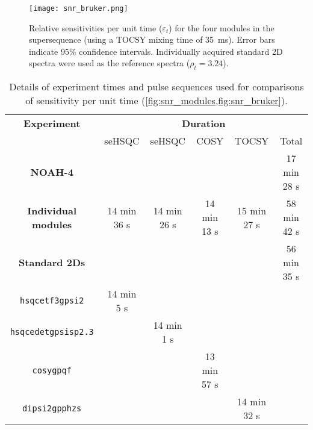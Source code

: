 \begin{figure}
    \centering
    \texttt{[image: snr\_bruker.png]}
    \caption{
        Relative sensitivities per unit time ($\varepsilon_t$) for the four modules in the  supersequence (using a TOCSY mixing time of \SI{35}{\ms}).
        Error bars indicate 95\% confidence intervals.
        Individually acquired standard 2D spectra were used as the reference spectra ($\rho_t = 3.24$).
        \zolmi{}
    }
    \label{fig:snr_bruker}
\end{figure}

{ %
\renewcommand{\arraystretch}{1.1}
\begin{table}
    \centering
    \begin{tabular}{cccccc}
        \toprule
        \textbf{Experiment} & \multicolumn{5}{c}{\textbf{Duration}} \\
                            & \nitrogen{} seHSQC & \carbon{} seHSQC & COSY & TOCSY & Total \\
        \midrule
        \textbf{NOAH-4}             & & & & & 17 min 28 s \\
        \midrule
        \textbf{Individual modules} & 14 min 36 s & 14 min 26 s & 14 min 13 s & 15 min 27 s & 58 min 42 s \\
        \midrule
        \textbf{Standard 2Ds}       & & & & & 56 min 35 s \\
        \texttt{hsqcetf3gpsi2}      & 14 min 5 s \\
        \texttt{hsqcedetgpsisp2.3}  & & 14 min 1 s \\
        \texttt{cosygpqf}           & & & 13 min 57 s \\
        \texttt{dipsi2gpphzs}       & & & & 14 min 32 s \\
        \bottomrule
    \end{tabular}
    \caption{
        Details of experiment times and pulse sequences used for comparisons of sensitivity per unit time (\cref{fig:snr_modules,fig:snr_bruker}).
        \zolmi{}
    }
    \label{tbl:bruker_expts}
\end{table}
} %

\printbibliography[heading=bibintoc,title={References}]
